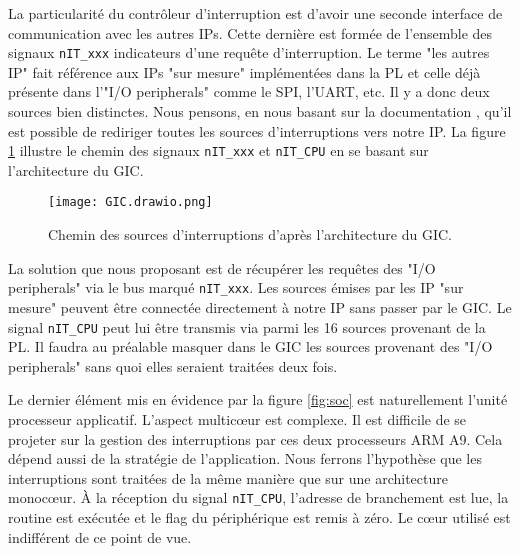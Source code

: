 \gap
La particularité du contrôleur d'interruption est d'avoir une seconde interface de communication avec les autres IPs.
Cette dernière est formée de l'ensemble des signaux \texttt{nIT\_xxx} indicateurs d'une requête d'interruption.
Le terme "les autres IP" fait référence aux IPs "sur mesure" implémentées dans la PL et celle déjà présente dans l'"I/O peripherals" comme le SPI, l'UART, etc.
Il y a donc deux sources bien distinctes.
Nous pensons, en nous basant sur la documentation \cite{Tech_Man_Xilinx}, qu'il est possible de rediriger toutes les sources d'interruptions vers notre IP.
La figure \ref{fig:GIC} illustre le chemin des signaux \texttt{nIT\_xxx} et \texttt{nIT\_CPU} en se basant sur l'architecture du GIC.
\begin{figure}[H]
    \centering
    \texttt{[image: GIC.drawio.png]}
    \caption{Chemin des sources d'interruptions d'après l'architecture du GIC.}
    \label{fig:GIC}
\end{figure}
La solution que nous proposant est de récupérer les requêtes des "I/O peripherals" via le bus marqué \texttt{nIT\_xxx}.
Les sources émises par les IP "sur mesure" peuvent être connectée directement à notre IP sans passer par le GIC.
Le signal \texttt{nIT\_CPU} peut lui être transmis via parmi les 16 sources provenant de la PL.
Il faudra au préalable masquer dans le GIC les sources provenant des "I/O peripherals" sans quoi elles seraient traitées deux fois.

\gap
Le dernier élément mis en évidence par la figure \ref{fig:soc} est naturellement l'unité processeur applicatif.
L'aspect multicœur est complexe.
Il est difficile de se projeter sur la gestion des interruptions par ces deux processeurs ARM A9.
Cela dépend aussi de la stratégie de l'application.
Nous ferrons l'hypothèse que les interruptions sont traitées de la même manière que sur une architecture monocœur.
À la réception du signal \texttt{nIT\_CPU}, l'adresse de branchement est lue, la routine est exécutée et le flag du périphérique est remis à zéro.
Le cœur utilisé est indifférent de ce point de vue.
